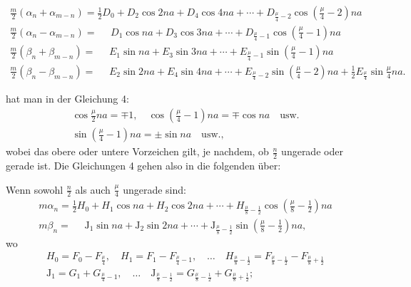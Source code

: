 \begin{landscape}
\[\begin{array}{l}
\frac{m}{2}(\alpha_n+\alpha_{m-n}) = \tfrac{1}{2}D_0 + D_2\cos 2na + D_4\cos 4na + \cdots + D_{\frac{\mu}{4}-2}\cos\left(\frac{\mu}{4}-2\right)na \\[4pt]
\frac{m}{2}(\alpha_n-\alpha_{m-n}) = \phantom{{}={}} D_1\cos na + D_3\cos 3na + \cdots + D_{\frac{\mu}{4}-1}\cos\left(\frac{\mu}{4}-1\right)na \\[4pt]
\frac{m}{2}(\beta_n+\beta_{m-n}) = \phantom{{}={}} E_1\sin na + E_3\sin 3na + \cdots + E_{\frac{\mu}{4}-1}\sin\left(\frac{\mu}{4}-1\right)na \\[4pt]
\frac{m}{2}(\beta_n-\beta_{m-n}) = \phantom{{}={}} E_2\sin 2na + E_4\sin 4na + \cdots + E_{\frac{\mu}{4}-2}\sin\left(\frac{\mu}{4}-2\right)na + \tfrac{1}{2}E_{\frac{\mu}{4}}\sin\frac{\mu}{4}na.
\end{array}
\]
\par\nobreak\medskip\noindent\hfill{}\hfill\mbox{}\par\nobreak\smallskip\noindent
hat man in \VtwoLowPoint der Gleichung 4:
\[
\begin{gathered}
\cos\frac{\mu}{2}na = \mp 1, \quad \cos\left(\frac{\mu}{4}-1\right)na = \mp\cos na \quad \text{usw.}\\[4pt]
\sin\left(\frac{\mu}{4}-1\right)na = \pm\sin na \quad \text{usw.,}
\end{gathered}
\]
wobei das obere oder untere Vorzeichen gilt, je nachdem, ob \(\frac{n}{2}\) ungerade oder gerade ist. Die Gleichungen 4 gehen also in die folgenden über:
\par\noindent\hspace*{\parindent}Wenn sowohl \(\frac{n}{2}\) als auch \(\frac{\mu}{4}\) ungerade sind:
\[
\tag*{7)}
\begin{array}{l}
m\alpha_n = \tfrac{1}{2}H_0 + H_1\cos na + H_2\cos 2na + \cdots + H_{\frac{\mu}{8}-\frac{1}{2}}\cos\left(\frac{\mu}{8}-\frac{1}{2}\right)na \\[4pt]
m\beta_n = \phantom{{}={}} \mathrm{J}_1\sin na + \mathrm{J}_2\sin 2na + \cdots + \mathrm{J}_{\frac{\mu}{8}-\frac{1}{2}}\sin\left(\frac{\mu}{8}-\frac{1}{2}\right)na,
\end{array}
\]
wo
\[
\begin{gathered}
H_0 = F_0 - F_{\frac{\mu}{4}}, \quad H_1 = F_1 - F_{\frac{\mu}{4}-1}, \quad \ldots \quad H_{\frac{\mu}{8}-\frac{1}{2}} = F_{\frac{\mu}{8}-\frac{1}{2}} - F_{\frac{\mu}{8}+\frac{1}{2}}\\[4pt]
\mathrm{J}_1 = G_1 + G_{\frac{\mu}{4}-1}, \quad \ldots \quad \mathrm{J}_{\frac{\mu}{8}-\frac{1}{2}} = G_{\frac{\mu}{8}-\frac{1}{2}} + G_{\frac{\mu}{8}+\frac{1}{2}};

\end{gathered}\]
\end{landscape}
